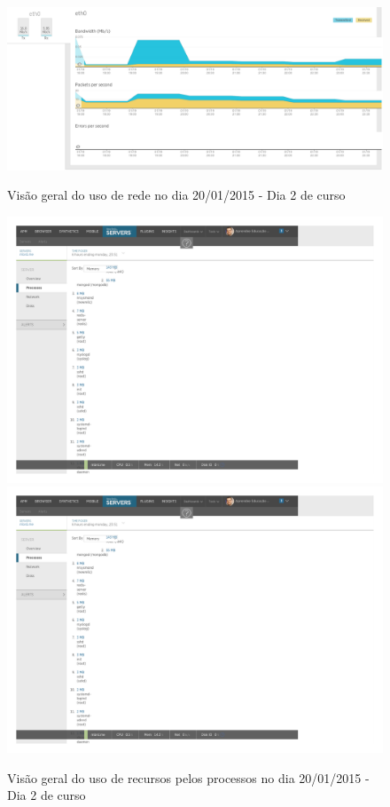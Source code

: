 \documentclass[
	12pt,				%
	oneside,			%
	a4paper,			%
	english,			%
	brazil				%
	]{abntex2ppgsi}
\begin{document}
\begin{apendicesenv}
\begin{figure}[ht]
\centering
\caption{Visão geral do uso de rede no dia 20/01/2015 - Dia 2 de curso}
\includegraphics[width=1.0\textwidth]{relatorios/20-01-15/network_cropped.pdf} 
\label{fig:recursos_dia2_3} 
\end{figure}

\begin{figure}[ht]
\centering
\caption{Visão geral do uso de recursos pelos processos no dia 20/01/2015 - Dia 2 de curso}
\includegraphics[page=2,width=1.0\textwidth]{relatorios/20-01-15/process-inspector_cropped.pdf} 
\includegraphics[page=3,width=1.0\textwidth]{relatorios/20-01-15/process-inspector_cropped.pdf} 
\label{fig:recursos_dia2_4} 
\end{figure}





\end{apendicesenv}
\end{document}

